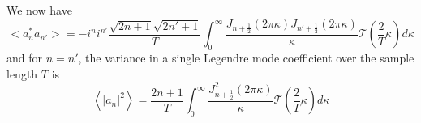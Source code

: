 \documentclass[11pt,preprint]{aastex}
\begin{document}
We now have
\begin{equation}
<a_n^* a_{n'}> = -i^n i^{n'} \frac{\sqrt{2n+1}\sqrt{2n'+1}}{T}   \int_{0}^{\infty} \frac{J_{n+\frac{1}{2}}(2\pi \kappa) J_{n'+\frac{1}{2}}(2\pi \kappa)}{\kappa} \mathcal{T}\left( \frac{2}{T} \kappa \right) d\kappa
\end{equation}
and for $n = n'$, the variance in a single Legendre mode coefficient over the sample length $T$ is
\begin{equation}
\left\langle \left|a_n\right|^2 \right\rangle = \frac{2n+1}{T}  \int_0^{\infty} \frac{ J_{n+\frac{1}{2}}^2(2\pi \kappa)}{\kappa} \mathcal{T}\left( \frac{2}{T} \kappa \right) d\kappa
\label{eqn:varcoeff}
\end{equation}



\end{document}
